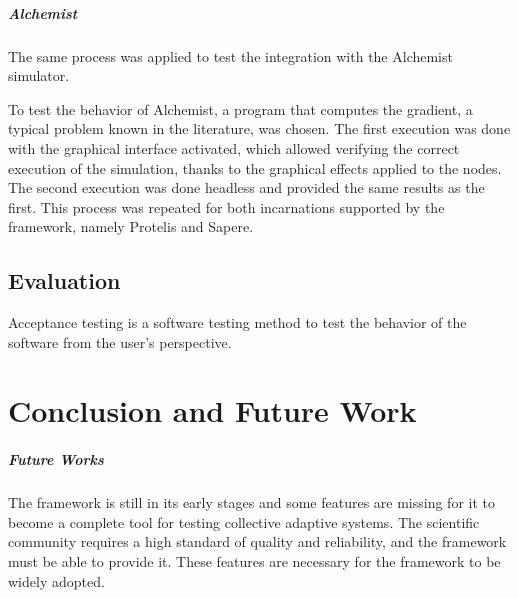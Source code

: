 \documentclass[12pt,a4paper,openright,twoside]{book}
\begin{document}
\paragraph*{Alchemist}
The same process was applied to test the integration with the Alchemist simulator.

To test the behavior of Alchemist, a program that computes the gradient, a typical problem known in the literature, was chosen. 
The first execution was done with the graphical interface activated, which allowed verifying the correct execution of the simulation, thanks to the graphical effects applied to the nodes. 
The second execution was done headless and provided the same results as the first. This process was repeated for both incarnations supported by the framework, namely Protelis and Sapere.



\section{Evaluation}
Acceptance testing is a software testing method to test the behavior of the software from the user's perspective.

\chapter{Conclusion and Future Work}

\paragraph*{Future Works}

The framework is still in its early stages and some features are missing for it to become a complete tool for testing collective adaptive systems.
The scientific community requires a high standard of quality and reliability, and the framework must be able to provide it.
These features are necessary for the framework to be widely adopted.
\end{document}
